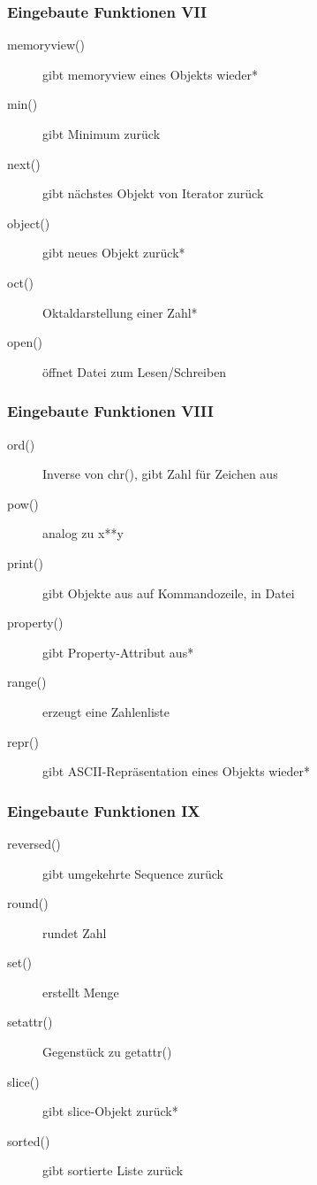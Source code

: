 \documentclass[ngerman]{beamer}
\begin{document}
\begin{frame}
\frametitle{Eingebaute Funktionen VII}

\begin{description}
\item[memoryview()] gibt memoryview eines Objekts wieder*
\item[min()] gibt Minimum zurück
\item[next()] gibt nächstes Objekt von Iterator zurück
\item[object()] gibt neues Objekt zurück*
\item[oct()] Oktaldarstellung einer Zahl*
\item[open()] öffnet Datei zum Lesen/Schreiben
\end{description}
\end{frame}


\begin{frame}
\frametitle{Eingebaute Funktionen VIII}

\begin{description}
\item[ord()] Inverse von chr(), gibt Zahl für Zeichen aus
\item[pow()] analog zu x**y
\item[print()] gibt Objekte aus auf Kommandozeile, in Datei
\item[property()] gibt Property-Attribut aus*
\item[range()] erzeugt eine Zahlenliste
\item[repr()] gibt ASCII-Repräsentation eines Objekts wieder*
\end{description}
\end{frame}


\begin{frame}
\frametitle{Eingebaute Funktionen IX}

\begin{description}
\item[reversed()] gibt umgekehrte Sequence zurück
\item[round()] rundet Zahl
\item[set()] erstellt Menge
\item[setattr()] Gegenstück zu getattr()
\item[slice()] gibt slice-Objekt zurück*
\item[sorted()] gibt sortierte Liste zurück
\end{description}
\end{frame}
\end{document}
